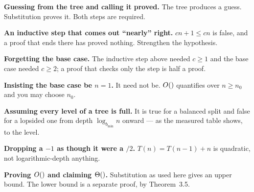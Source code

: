 \begin{pitfall}
\begin{tight}
  \item \textbf{Guessing from the tree and calling it proved.} The tree
        produces a guess. Substitution proves it. Both steps are required.
  \item \textbf{An inductive step that comes out ``nearly'' right.}
        $cn + 1 \le cn$ is false, and a proof that ends there has proved
        nothing. Strengthen the hypothesis.
  \item \textbf{Forgetting the base case.} The inductive step above needed
        $c \ge 1$ and the base case needed $c \ge 2$; a proof that checks only
        the step is half a proof.
  \item \textbf{Insisting the base case be $n = 1$.} It need not be. $O()$
        quantifies over $n \ge n_{0}$ and you may choose $n_{0}$.
  \item \textbf{Assuming every level of a tree is full.} It is true for a
        balanced split and false for a lopsided one from depth
        $\log_{b_{\min}} n$ onward --- as the measured table shows, to the
        level.
  \item \textbf{Dropping a $-1$ as though it were a $/2$.}
        $T(n) = T(n-1)+n$ is quadratic, not logarithmic-depth anything.
  \item \textbf{Proving $O()$ and claiming $\Theta()$.} Substitution as
        used here gives an upper bound. The lower bound is a separate proof,
        by Theorem~3.5.
\end{tight}
\end{pitfall}

